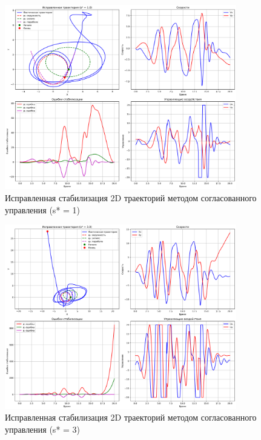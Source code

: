 \begin{figure}[H]
\centering
\includegraphics[width=0.9\textwidth]{images/task1/corrected_2d_s1.0.png}
\caption{Исправленная стабилизация 2D траекторий методом согласованного управления (s* = 1)}
\label{fig:corrected_2d_s1}
\end{figure}

\begin{figure}[H]
\centering
\includegraphics[width=0.9\textwidth]{images/task1/corrected_2d_s3.0.png}
\caption{Исправленная стабилизация 2D траекторий методом согласованного управления (s* = 3)}
\label{fig:corrected_2d_s3}
\end{figure}

